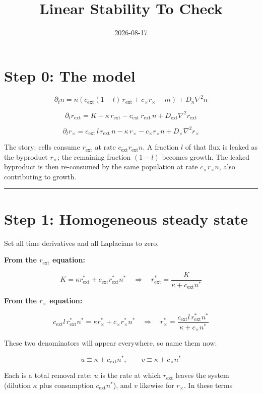 \documentclass[11pt]{article}
\title{Linear Stability To Check}
\date{2026-08-17}
\author{}
\begin{document}
\maketitle

\section*{Step 0: The model}

\[
\partial_t n = n\left(c_{\text{ext}}(1-l)\,r_{\text{ext}} + c_\times r_\times - m\right) + D_n \nabla^2 n
\]

\[
\partial_t r_{\text{ext}} = K - \kappa\, r_{\text{ext}} - c_{\text{ext}}\, r_{\text{ext}}\, n + D_{\text{ext}} \nabla^2 r_{\text{ext}}
\]

\[
\partial_t r_\times = c_{\text{ext}}\, l\, r_{\text{ext}}\, n - \kappa\, r_\times - c_\times r_\times n + D_\times \nabla^2 r_\times
\]

The story: cells consume $r_{\text{ext}}$ at rate $c_{\text{ext}} r_{\text{ext}} n$. A fraction $l$ of that flux is leaked as the byproduct $r_\times$; the remaining fraction $(1-l)$ becomes growth. The leaked byproduct is then re-consumed by the same population at rate $c_\times r_\times n$, also contributing to growth.

\bigskip\hrule\bigskip

\section*{Step 1: Homogeneous steady state}

Set all time derivatives and all Laplacians to zero.

\textbf{From the $r_{\text{ext}}$ equation:}

\[
K = \kappa r_{\text{ext}}^* + c_{\text{ext}} r_{\text{ext}}^* n^* \quad\Longrightarrow\quad r_{\text{ext}}^* = \frac{K}{\kappa + c_{\text{ext}} n^*}
\]

\textbf{From the $r_\times$ equation:}

\[
c_{\text{ext}} l\, r_{\text{ext}}^* n^* = \kappa r_\times^* + c_\times r_\times^* n^* \quad\Longrightarrow\quad r_\times^* = \frac{c_{\text{ext}} l\, r_{\text{ext}}^* n^*}{\kappa + c_\times n^*}
\]

These two denominators will appear everywhere, so name them now:

\[
\boxed{\;u \equiv \kappa + c_{\text{ext}} n^*, \qquad v \equiv \kappa + c_\times n^*\;}
\]

Each is a total removal rate: $u$ is the rate at which $r_{\text{ext}}$ leaves the system (dilution $\kappa$ plus consumption $c_{\text{ext}}n^*$), and $v$ likewise for $r_\times$. In these terms
\end{document}
